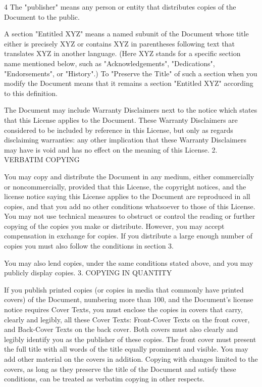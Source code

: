 \documentclass[fontsize=11pt,paper=A4,BCOR=12mm,DIV=13,open=any,listof=totoc,toc=flat]{scrbook}
\begin{document}
{\begin{multicols}{4}
The "publisher" means any person or entity that distributes copies of the Document to the public.

A section "Entitled XYZ" means a named subunit of the Document whose title either is precisely XYZ or contains XYZ in parentheses following text that translates XYZ in another language. (Here XYZ stands for a specific section name mentioned below, such as "Acknowledgements", "Dedications", "Endorsements", or "History".) To "Preserve the Title" of such a section when you modify the Document means that it remains a section "Entitled XYZ" according to this definition.

The Document may include Warranty Disclaimers next to the notice which states that this License applies to the Document. These Warranty Disclaimers are considered to be included by reference in this License, but only as regards disclaiming warranties: any other implication that these Warranty Disclaimers may have is void and has no effect on the meaning of this License.
2. VERBATIM COPYING

You may copy and distribute the Document in any medium, either commercially or noncommercially, provided that this License, the copyright notices, and the license notice saying this License applies to the Document are reproduced in all copies, and that you add no other conditions whatsoever to those of this License. You may not use technical measures to obstruct or control the reading or further copying of the copies you make or distribute. However, you may accept compensation in exchange for copies. If you distribute a large enough number of copies you must also follow the conditions in section 3.

You may also lend copies, under the same conditions stated above, and you may publicly display copies.
3. COPYING IN QUANTITY

If you publish printed copies (or copies in media that commonly have printed covers) of the Document, numbering more than 100, and the Document's license notice requires Cover Texts, you must enclose the copies in covers that carry, clearly and legibly, all these Cover Texts: Front-Cover Texts on the front cover, and Back-Cover Texts on the back cover. Both covers must also clearly and legibly identify you as the publisher of these copies. The front cover must present the full title with all words of the title equally prominent and visible. You may add other material on the covers in addition. Copying with changes limited to the covers, as long as they preserve the title of the Document and satisfy these conditions, can be treated as verbatim copying in other respects.


\end{multicols}}
\end{document}
